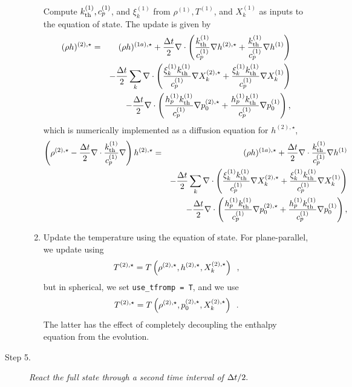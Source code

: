 \begin{description}
\begin{enumerate}
Compute $k_{\rm th}^{(1)}, c_p^{(1)}$, and $\xi_k^{(1)}$ from $\rho^{(1)}, T^{(1)}$, and $X_k^{(1)}$ as inputs to the equation of state.  The update is given by
\begin{eqnarray}
(\rho h)^{(2),\star} &=& (\rho h)^{(1a),\star} + \frac{\Delta t}{2}\nabla\cdot\left(\frac{k_{\rm th}^{(1)}}{c_p^{(1)}}\nabla h^{(2),\star} + \frac{k_{\rm th}^{(1)}}{c_p^{(1)}}\nabla h^{(1)}\right)\nonumber\\
&&- \frac{\Delta t}{2}\sum_k\nabla\cdot\left(\frac{\xi_k^{(1)}k_{\rm th}^{(1)}}{c_p^{(1)}}\nabla X_k^{(2),\star} + \frac{\xi_k^{(1)}k_{\rm th}^{(1)}}{c_p^{(1)}}\nabla X_k^{(1)}\right)\nonumber\\
&&- \frac{\Delta t}{2}\nabla\cdot\left(\frac{h_p^{(1)}k_{\rm th}^{(1)}}{c_p^{(1)}}\nabla p_0^{(2),\star} + \frac{h_p^{(1)}k_{\rm th}^{(1)}}{c_p^{(1)}}\nabla p_0^{(1)}\right),
\end{eqnarray}
which is numerically implemented as a diffusion equation for $h^{(2),\star}$,
\begin{eqnarray}
\left(\rho^{(2),\star} - \frac{\Delta t}{2}\nabla\cdot\frac{k_{\rm th}^{(1)}}{c_p^{(1)}}\nabla\right)h^{(2),\star} &=& (\rho h)^{(1a),\star} + \frac{\Delta t}{2}\nabla\cdot\frac{k_{\rm th}^{(1)}}{c_p^{(1)}}\nabla h^{(1)}\nonumber\\
&&- \frac{\Delta t}{2}\sum_k\nabla\cdot\left(\frac{\xi_k^{(1)}k_{\rm th}^{(1)}}{c_p^{(1)}}\nabla X_k^{(2),\star} + \frac{\xi_k^{(1)}k_{\rm th}^{(1)}}{c_p^{(1)}}\nabla X_k^{(1)}\right)\nonumber\\
&&- \frac{\Delta t}{2}\nabla\cdot\left(\frac{h_p^{(1)}k_{\rm th}^{(1)}}{c_p^{(1)}}\nabla p_0^{(2),\star} + \frac{h_p^{(1)}k_{\rm th}^{(1)}}{c_p^{(1)}}\nabla p_0^{(1)}\right),
\end{eqnarray}
\item Update the temperature using the equation of state.  For plane-parallel,
we update using
\begin{equation}
T^{(2),\star} = T\left(\rho^{(2),\star}, h^{(2),\star}, X_k^{(2),\star}\right) \enskip ,
\end{equation}
but in spherical, we set {\tt use\_tfromp = T}, and we use
\begin{equation}
T^{(2),\star} = T\left(\rho^{(2),\star}, p_0^{(2),\star}, X_k^{(2),\star}\right) \enskip .
\end{equation}
The latter has the effect of completely decoupling the enthalpy equation from the 
evolution.

\end{enumerate}

\item[Step 5.] {\em React the full state through a second time interval of $\Delta t / 2.$}


\end{description}
